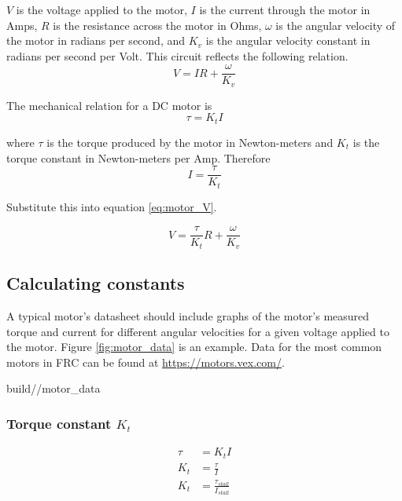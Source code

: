 $V$ is the voltage applied to the motor, $I$ is the current through the motor in
Amps, $R$ is the resistance across the motor in Ohms, $\omega$ is the angular
velocity of the motor in radians per second, and $K_v$ is the angular velocity
constant in radians per second per Volt. This circuit reflects the following
relation.
\begin{equation}
  V = IR + \frac{\omega}{K_v} \label{eq:motor_V}
\end{equation}

The mechanical relation for a DC motor is
\begin{equation}
  \tau = K_t I
\end{equation}

where $\tau$ is the torque produced by the motor in Newton-meters and $K_t$ is
the torque constant in Newton-meters per Amp. Therefore
\begin{equation*}
  I = \frac{\tau}{K_t}
\end{equation*}

Substitute this into equation \eqref{eq:motor_V}.

\begin{equation}
  V = \frac{\tau}{K_t} R + \frac{\omega}{K_v} \label{eq:motor_tau_V}
\end{equation}

\subsection{Calculating constants}

A typical motor's datasheet should include graphs of the motor's measured torque
and current for different angular velocities for a given voltage applied to the
motor. Figure \ref{fig:motor_data} is an example. Data for the most common
motors in FRC can be found at \url{https://motors.vex.com/}.
\begin{svg}{build/\chapterpath/motor_data}
  \caption{Example motor datasheet for 775pro}
  \label{fig:motor_data}
\end{svg}

\subsubsection{Torque constant $K_t$}
\begin{align}
  \tau &= K_t I \nonumber \\
  K_t &= \frac{\tau}{I} \nonumber \\
  K_t &= \frac{\tau_{stall}}{I_{stall}}
\end{align}

